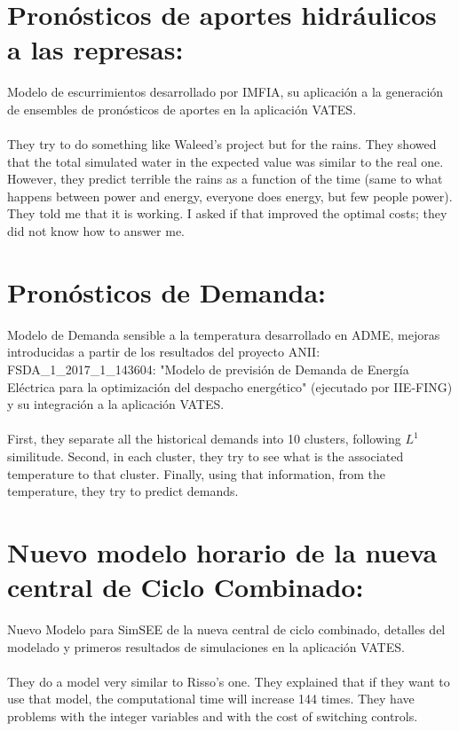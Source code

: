 \documentclass[12pt]{article}
\theoremstyle{definition}
\theoremstyle{remark}
\begin{document}
\section*{Pron\'osticos de aportes hidr\'aulicos a las represas:}
Modelo de escurrimientos desarrollado por IMFIA, su aplicaci\'on a la generaci\'on de ensembles de pron\'osticos de aportes en la aplicaci\'on VATES.\\
\quad\\
{\color{blue} They try to do something like Waleed's project but for the rains. They showed that the total simulated water in the expected value was similar to the real one. However, they predict terrible the rains as a function of the time (same to what happens between power and energy, everyone does energy, but few people power).\\
They told me that it is working. I asked if that improved the optimal costs; they did not know how to answer me.}

\section*{Pron\'osticos de Demanda:}
Modelo de Demanda sensible a la temperatura desarrollado en ADME, mejoras introducidas a partir de los resultados del proyecto ANII: FSDA\_1\_2017\_1\_143604: "Modelo de previsi\'on de Demanda de Energ\'ia El\'ectrica para la optimizaci\'on del despacho energ\'etico" (ejecutado por IIE-FING) y su integraci\'on a la aplicaci\'on VATES.\\
\quad\\
{\color{blue} First, they separate all the historical demands into 10 clusters, following $L^1$ similitude. Second, in each cluster, they try to see what is the associated temperature to that cluster. Finally, using that information, from the temperature, they try to predict demands.}

\section*{Nuevo modelo horario de la nueva central de Ciclo Combinado:}
Nuevo Modelo para SimSEE de la nueva central de ciclo combinado, detalles del modelado y primeros resultados de simulaciones en la aplicaci\'on VATES.\\
\quad\\
{\color{blue} They do a model very similar to Risso's one. They explained that if they want to use that model, the computational time will increase 144 times. They have problems with the integer variables and with the cost of switching controls.}
\end{document}
